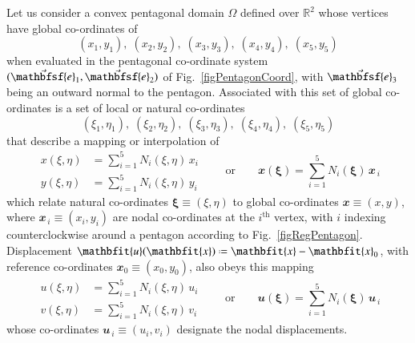 Let us consider a convex pentagonal domain $\Omega$ defined over $\mathbb{R}^2$ whose vertices have global co-ordinates of
\begin{displaymath}
(x_1, y_1) , \; (x_2, y_2) , \; (x_3, y_3) , \; (x_4, y_4), \; (x_5, y_5)
\end{displaymath}
when evaluated in the pentagonal co-ordinate system $( \vec{\mathbfsf{e}}_1 , \vec{\mathbfsf{e}}_2 )$ of Fig.~\ref{figPentagonCoord}, with $\vec{\mathbfsf{e}}_3$ being an outward normal to the pentagon.  Associated with this set of global co-ordinates is a set of local or natural co-ordinates
\begin{displaymath}
(\xi_1 , \eta_1) , \; (\xi_2 , \eta_2) , \; (\xi_3 , \eta_3) , \; (\xi_4 , \eta_4) , \; (\xi_5 , \eta_5)
\end{displaymath}
that describe a mapping or interpolation of
\begin{equation}
\begin{aligned}
x(\xi, \eta) & = \sum\nolimits_{i=1}^5 N_i (\xi, \eta) \, x_i \\
y(\xi, \eta) & = \sum\nolimits_{i=1}^5 N_i (\xi, \eta) \, y_i
\end{aligned} 
\qquad \text{or} \qquad
\mathbfit{x}(\boldsymbol{\xi}) = \sum_{i=1}^5 N_i (\boldsymbol{\xi}) \, 
\mathbfit{x}_{\,i}
\end{equation}
which relate natural co-ordinates $\boldsymbol{\xi} \equiv (\xi, \eta)$ to global co-ordinates $\mathbfit{x} \equiv (x, y)$, where $\mathbfit{x}_{\,i} \equiv (x_i, y_i)$ are nodal co-ordinates at the $i^{\mathrm{th}}$ vertex, with $i$ indexing counterclockwise around a pentagon according to Fig.~\ref{figRegPentagon}.  Displacement $\mathbfit{u} (\mathbfit{x}) \defeq \mathbfit{x} - \mathbfit{x}_0$, with reference co-ordinates $\mathbfit{x}_0 \equiv (x_0, y_0)$, also obeys this mapping
\begin{equation}
\begin{aligned}
u(\xi, \eta) & = \sum\nolimits_{i=1}^5 N_i (\xi, \eta) \, u_i \\
v(\xi, \eta) & = \sum\nolimits_{i=1}^5 N_i (\xi, \eta) \, v_i
\end{aligned} 
\qquad \text{or} \qquad
\mathbfit{u}(\boldsymbol{\xi}) = \sum_{i=1}^5 N_i (\boldsymbol{\xi}) \, 
\mathbfit{u}_{\,i}
\end{equation}
whose co-ordinates $\mathbfit{u}_{\,i} \equiv (u_i , v_i)$ designate the nodal displacements.

